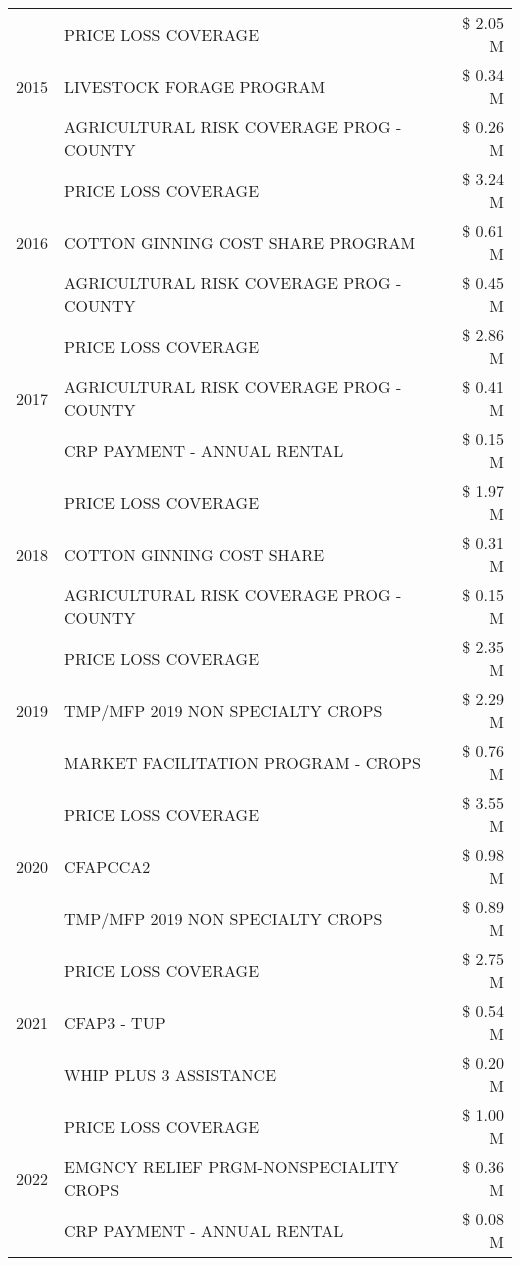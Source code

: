 \begin{tabular}{llr}
\cline{1-3}
\multirow[t]{3}{*}{2015} & PRICE LOSS COVERAGE & \$ 2.05 M \\
 & LIVESTOCK FORAGE PROGRAM & \$ 0.34 M \\
 & AGRICULTURAL RISK COVERAGE PROG - COUNTY & \$ 0.26 M \\
\cline{1-3}
\multirow[t]{3}{*}{2016} & PRICE LOSS COVERAGE & \$ 3.24 M \\
 & COTTON GINNING COST SHARE PROGRAM & \$ 0.61 M \\
 & AGRICULTURAL RISK COVERAGE PROG - COUNTY & \$ 0.45 M \\
\cline{1-3}
\multirow[t]{3}{*}{2017} & PRICE LOSS COVERAGE & \$ 2.86 M \\
 & AGRICULTURAL RISK COVERAGE PROG - COUNTY & \$ 0.41 M \\
 & CRP PAYMENT - ANNUAL RENTAL & \$ 0.15 M \\
\cline{1-3}
\multirow[t]{3}{*}{2018} & PRICE LOSS COVERAGE & \$ 1.97 M \\
 & COTTON GINNING COST SHARE & \$ 0.31 M \\
 & AGRICULTURAL RISK COVERAGE PROG - COUNTY & \$ 0.15 M \\
\cline{1-3}
\multirow[t]{3}{*}{2019} & PRICE LOSS COVERAGE & \$ 2.35 M \\
 & TMP/MFP 2019 NON SPECIALTY CROPS & \$ 2.29 M \\
 & MARKET FACILITATION PROGRAM - CROPS & \$ 0.76 M \\
\cline{1-3}
\multirow[t]{3}{*}{2020} & PRICE LOSS COVERAGE & \$ 3.55 M \\
 & CFAPCCA2 & \$ 0.98 M \\
 & TMP/MFP 2019 NON SPECIALTY CROPS & \$ 0.89 M \\
\cline{1-3}
\multirow[t]{3}{*}{2021} & PRICE LOSS COVERAGE & \$ 2.75 M \\
 & CFAP3 - TUP & \$ 0.54 M \\
 & WHIP PLUS 3 ASSISTANCE & \$ 0.20 M \\
\cline{1-3}
\multirow[t]{3}{*}{2022} & PRICE LOSS COVERAGE & \$ 1.00 M \\
 & EMGNCY RELIEF PRGM-NONSPECIALITY CROPS & \$ 0.36 M \\
 & CRP PAYMENT - ANNUAL RENTAL & \$ 0.08 M \\
\cline{1-3}
\bottomrule
\end{tabular}
